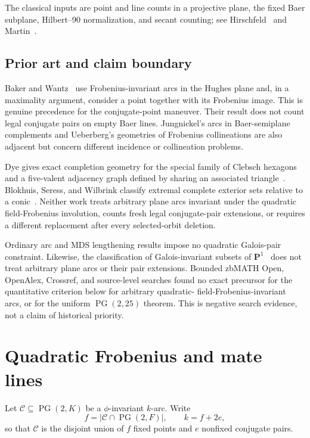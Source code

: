 \documentclass[11pt]{article}
\theoremstyle{definition}
\theoremstyle{remark}
\newcommand{\PG}{\operatorname{PG}}
\newcommand{\cC}{\mathcal{C}}
\begin{document}
The classical inputs are point and line counts in a projective plane, the
fixed Baer subplane, Hilbert--90 normalization, and secant counting; see
Hirschfeld~\cite{Hirschfeld1998} and Martin~\cite{Martin1967}.

\subsection*{Prior art and claim boundary}

Baker and Wantz~\cite{BakerWantz2005} use Frobenius-invariant arcs in the
Hughes plane and, in a maximality argument, consider a point together with
its Frobenius image.  This is genuine precedence for the conjugate-point
maneuver.  Their result does not count legal conjugate pairs on empty Baer
lines.  Jungnickel's arcs in Baer-semiplane complements
\cite{Jungnickel1987} and Ueberberg's geometries of Frobenius collineations
\cite{Ueberberg1997} are also adjacent but concern different incidence or
collineation problems.

Dye gives exact completion geometry for the special family of Clebsch
hexagons and a five-valent adjacency graph defined by sharing an associated
triangle~\cite[Proposition~1 and Theorems~7--8, pp.~282--284]{Dye1991}.
Blokhuis, Seress, and Wilbrink classify extremal complete exterior sets
relative to a conic~\cite[pp.~143--146]{BlokhuisSeressWilbrink1992}.
Neither work treats arbitrary plane arcs invariant under the quadratic
field-Frobenius involution, counts fresh legal conjugate-pair extensions, or
requires a different replacement after every selected-orbit deletion.

Ordinary arc and MDS lengthening results
\cite{Alderson2005,AldersonBruenSilverman2007,Alderson2026} impose no
quadratic Galois-pair constraint.  Likewise, the classification of
Galois-invariant subsets of $\mathbf P^1$~\cite{LopezMaisnerNartXarles2002}
does not treat arbitrary plane arcs or their pair extensions.  Bounded
zbMATH Open, OpenAlex, Crossref, and source-level searches found no exact
precursor for the quantitative criterion below for arbitrary quadratic-
field-Frobenius-invariant arcs, or for the uniform $\PG(2,25)$ theorem.
This is negative search evidence, not a claim of historical priority.

\section{Quadratic Frobenius and mate lines}

Let $\cC\subseteq\PG(2,K)$ be a $\phi$-invariant $k$-arc.  Write
\[
  f=|\cC\cap\PG(2,F)|,
  \qquad k=f+2e,
\]
so that $\cC$ is the disjoint union of $f$ fixed points and $e$ nonfixed
conjugate pairs.
\end{document}
